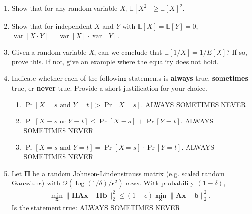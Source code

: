 \documentclass[10pt]{article}
\newcommand{\bs}[1]{\boldsymbol{#1}}
\newcommand{\bv}[1]{\mathbf{#1}}
\newcommand{\E}{\mathbb{E}}
\DeclareMathOperator*{\Var}{var}
\begin{document}
	\begin{enumerate}
		\item Show that for any  random variable ${X}$, $\E[{X}^2] \ge \E[{X}]^2$.
		\item Show that for independent ${X}$ and ${Y}$ with $\E[{X}] = \E[{Y}] = 0$, $\Var[{X} \cdot {Y}] = \Var[X] \cdot \Var[Y]$. 
		\item Given a random variable $X$, can we conclude that $\E[1/X] = 1/E[X]$? If so, prove this. If not, give an example where the equality does not hold.
		\item Indicate whether each of the following statements is \textbf{always} true, \textbf{sometimes} true, or \textbf{never} true. Provide a short justification for your choice. 
		\begin{enumerate}[label=(\alph*)]
			\item $\Pr[{X} = s \text{ and } {Y} = t] > \Pr[{X} = s]$. \hspace{1em}ALWAYS\hspace{1em} SOMETIMES\hspace{1em} NEVER
			\item $\Pr[{X} = s \text{ or }  {Y} = t] \le \Pr[{X} = s] + \Pr[{Y} = t]$. \hspace{1em}ALWAYS \hspace{1em} SOMETIMES\hspace{1em} NEVER
			\item $\Pr[{X} = s \text{ and } {Y} = t] = \Pr[{X} = s] \cdot \Pr[{Y} = t]$. \hspace{1em}ALWAYS\hspace{1em} SOMETIMES \hspace{1em} NEVER
		\end{enumerate}
		\item Let $\bs{\Pi}$ be a random Johnson-Lindenstrauss matrix (e.g. scaled random Gaussians) with $O(\log(1/\delta)/\epsilon^2)$ rows. With probability $(1-\delta)$,
		\begin{align*}
			\min_{\bv{x}} \|\bs{\Pi}\bv{A}\bv{x} - \bs{\Pi}\bv{b}\|_2^2 \leq (1+\epsilon) \min_{\bv{x}} \|\bv{A}\bv{x} - \bv{b}\|_2^2. 
		\end{align*}
		Is the statement true: \hspace{1em}ALWAYS\hspace{1em} SOMETIMES \hspace{1em} NEVER


\end{enumerate}
\end{document}
